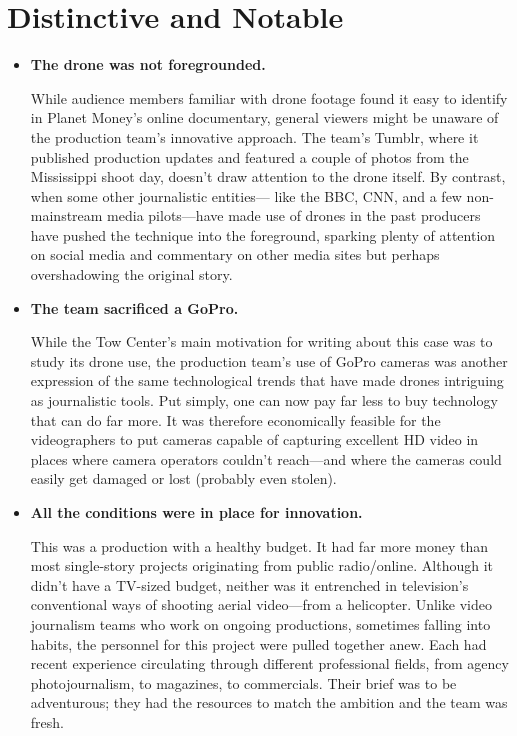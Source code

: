 \section{Distinctive and Notable}
\begin{itemize}
\item \textbf{The drone was not foregrounded.}

While audience members familiar with drone footage found it easy to
identify in Planet Money's online documentary, general viewers might
be unaware of the production team's innovative approach. The team's
Tumblr, where it published production updates and featured a couple
of photos from the Mississippi shoot day, doesn't draw attention to
the drone itself. By contrast, when some other journalistic entities—
like the BBC, CNN, and a few non-mainstream media pilots—have
made use of drones in the past producers have pushed the technique
into the foreground, sparking plenty of attention on social media and
commentary on other media sites but perhaps overshadowing the
original story.

\item \textbf{The team sacrificed a GoPro.}

While the Tow Center's main motivation for writing about this case
was to study its drone use, the production team's use of GoPro cameras
was another expression of the same technological trends that
have made drones intriguing as journalistic tools. Put simply, one can
now pay far less to buy technology that can do far more. It was therefore
economically feasible for the videographers to put cameras capable
of capturing excellent HD video in places where camera operators
couldn't reach—and where the cameras could easily get damaged or
lost (probably even stolen).

\item \textbf{All the conditions were in place for innovation.}

This was a production with a healthy budget. It had far more money
than most single-story projects originating from public radio/online.
Although it didn't have a TV-sized budget, neither was it entrenched
in television's conventional ways of shooting aerial video—from a
helicopter. Unlike video journalism teams who work on ongoing productions,
sometimes falling into habits, the personnel for this project
were pulled together anew. Each had recent experience circulating
through different professional fields, from agency photojournalism,
to magazines, to commercials. Their brief was to be adventurous; they
had the resources to match the ambition and the team was fresh.


\end{itemize}
